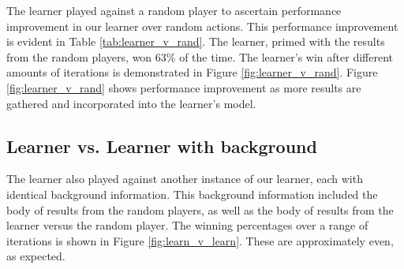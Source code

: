 \documentclass[12pt,pdftex]{article}
\begin{document}
The learner played against a random player to ascertain performance improvement in our learner over random actions. 
This performance improvement is evident in Table \ref{tab:learner_v_rand}. 
The learner, primed with the results from the random players, won 63\% of the time.  
The learner's win after different amounts of iterations is demonstrated in Figure \ref{fig:learner_v_rand}.
Figure \ref{fig:learner_v_rand} shows performance improvement as more results are gathered and incorporated into the learner's model.

\subsection{Learner vs. Learner with background}
The learner also played against another instance of our learner, each with identical background information.
This background information included the body of results from the random players, as well as the body of results from the learner versus the random player. 
The winning percentages over a range of iterations is shown in Figure \ref{fig:learn_v_learn}.
These are approximately even, as expected. 

\end{document}
